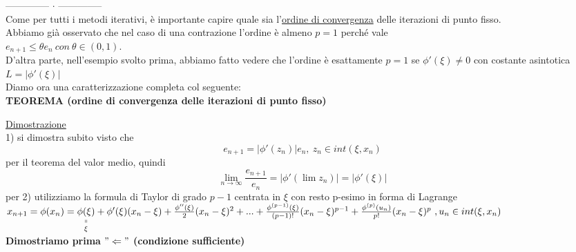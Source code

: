 \documentclass[12pt]{article}
\begin{document}
\medskip
-------------- $\cdot$ --------------\\
Come per tutti i metodi iterativi, è importante capire quale sia l'\underline{ordine di convergenza} delle iterazioni di punto fisso.\\
Abbiamo già osservato che nel caso di una contrazione l'ordine è almeno $p=1$ perché vale\\ $e_{n+1}\leq\theta e_n \ con \ \theta \in (0,1)$.\\
D'altra parte, nell'esempio svolto prima, abbiamo fatto vedere che l'ordine è esattamente $p=1$ se $\phi'(\xi)\neq 0$ con costante asintotica $L=|\phi'(\xi)|$\\
Diamo ora una caratterizzazione completa col seguente:\\
\textbf{TEOREMA (ordine di convergenza delle iterazioni di punto fisso)}
\begin{center}
\end{center}
\underline{Dimostrazione}\\
1) si dimostra subito visto che 
\[e_{n+1}=|\phi'(z_n)|e_n, \ z_n \in int(\xi,x_n)\]
per il teorema del valor medio, quindi 
\[\lim\limits_{n\to\infty} \frac{e_{n+1}}{e_n} = |\phi'(\lim z_n)|=|\phi'(\xi)|\]
per 2) utilizziamo la formula di Taylor di grado $p-1$ centrata in $\xi$ con resto p-esimo in forma di Lagrange \\
$x_{n+1}=\phi(x_n)=\underset{\xi}{\underset{\shortparallel}{\phi(\xi)}}+ \phi'(\xi)(x_n-\xi)+\frac{\phi''(\xi)}{2}(x_n-\xi)^2+...+\frac{\phi^{(p-1)}(\xi)}{(p-1)!}(x_n-\xi)^{p-1}+\frac{\phi^{(p)}(u_n)}{p!}(x_n-\xi)^p \ , \\ u_n \in int(\xi,x_n)$\\
\textbf{Dimostriamo prima $"\Leftarrow"$ (condizione sufficiente)}\\
\end{document}
